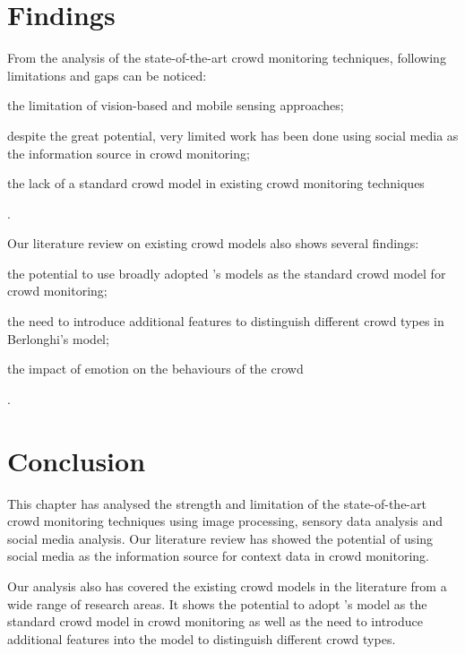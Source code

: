 \section{Findings}
From the analysis of the state-of-the-art crowd monitoring techniques, following limitations and gaps can be noticed:
\begin{inparaenum}[i)]
	\item the limitation of vision-based and mobile sensing approaches;
	\item despite the great potential, very limited work has been done using social media as the information source in crowd monitoring;
	\item the lack of a standard crowd model in existing crowd monitoring techniques
\end{inparaenum}.

Our literature review on existing crowd models also shows several findings:
\begin{inparaenum}[i)]
	\item the potential to use broadly adopted \textcite{Berlonghi1995}'s models as the standard crowd model for crowd monitoring;
	\item the need to introduce additional features to distinguish different crowd types in Berlonghi's model;
	\item the impact of emotion on the behaviours of the crowd
\end{inparaenum}.

\section{Conclusion}
This chapter has analysed the strength and limitation of the state-of-the-art crowd monitoring techniques using image processing, sensory data analysis and social media analysis. Our literature review has showed the potential of using social media as the information source for context data in crowd monitoring.

Our analysis also has covered the existing crowd models in the literature from a wide range of research areas. It shows the potential to adopt \textcite{Berlonghi1995}'s model as the standard crowd model in crowd monitoring as well as the need to introduce additional features into the model to distinguish different crowd types.